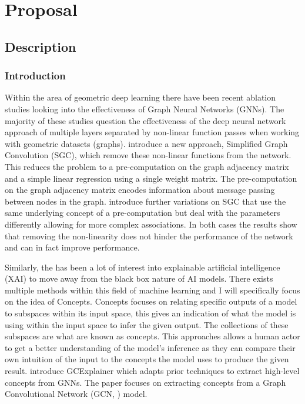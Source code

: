 \chapter{Proposal}
\section{Description}

\subsection{Introduction}

Within the area of geometric deep learning there have been recent ablation studies looking into the effectiveness of Graph Neural Networks (GNNs). The majority of these studies question the effectiveness of the deep neural network approach of multiple layers separated by non-linear function passes when working with geometric datasets (graphs). \cite{wu2019simplifying} introduce a new approach, Simplified Graph Convolution (SGC), which remove these non-linear functions from the network. This reduces the problem to a pre-computation on the graph adjacency matrix and a simple linear regression using a single weight matrix. The pre-computation on the graph adjacency matrix encodes information about message passing between nodes in the graph.  \cite{chanpuriya2022simplified} introduce further variations on SGC that use the same underlying concept of a pre-computation but deal with the parameters differently allowing for more complex associations. In both cases the results show that removing the non-linearity does not hinder the performance of the network and can in fact improve performance.

Similarly, the has been a lot of interest into explainable artificial intelligence (XAI) to move away from the black box nature of AI models. There exists multiple methods within this field of machine learning and I will specifically focus on the idea of Concepts. Concepts focuses on relating specific outputs of a model to subspaces within its input space, this gives an indication of what the model is using within the input space to infer the given output. The collections of these subspaces are what are known as concepts. This approaches allows a human actor to get a better understanding of the model's inference as they can compare their own intuition of the input to the concepts the model uses to produce the given result.
\cite{magister2021gcexplainer} introduce GCExplainer which adapts prior techniques to extract high-level concepts from GNNs. The paper focuses on extracting concepts from a Graph Convolutional Network (GCN, \cite{kipf2016semi}) model.

